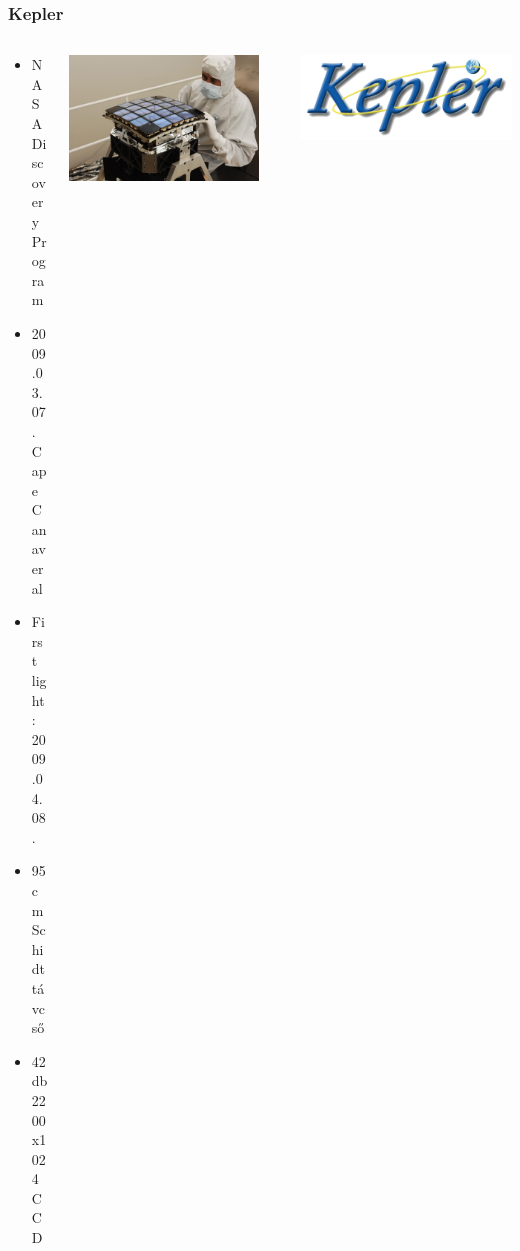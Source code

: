 \begin{frame}
	\frametitle{Kepler}
	\begin{columns}
		\begin{column}{0.5\textwidth}
			\begin{itemize}
				\item NASA Discovery Program
				\item 2009.03.07. Cape Canaveral
				\item First light: 2009.04.08.
				\item 95 cm Schidt távcső
				\item 42 db 2200x1024 CCD
			\end{itemize}
		\end{column}
		\begin{column}{0.5\textwidth}
			\hspace*{0.7cm}
			\vspace{-3cm}
			\includegraphics[width=0.9\textwidth]{figures/kepler_eye.jpg}
		\end{column}
		\begin{column}{0.5\textwidth}
			\hspace*{-5.5cm}
			\vspace*{4cm}
			\includegraphics[width=1.0\textwidth]{figures/kepler_logo.png}
		\end{column}
	\end{columns}
\end{frame}


